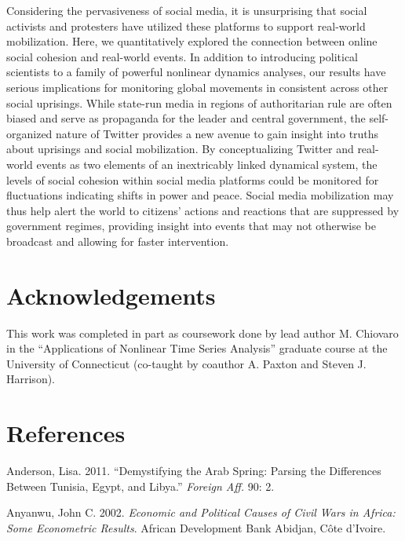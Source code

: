 \documentclass[
  english,
  man]{apa6}
\begin{document}
Considering the pervasiveness of social media, it is unsurprising that social
activists and protesters have utilized these platforms to support real-world
mobilization. Here, we quantitatively explored the connection between online
social cohesion and real-world events. In addition to introducing political
scientists to a family of powerful nonlinear dynamics analyses, our results have
serious implications for monitoring global movements in consistent across other
social uprisings. While state-run media in regions of authoritarian rule are
often biased and serve as propaganda for the leader and central government, the
self-organized nature of Twitter provides a new avenue to gain insight into
truths about uprisings and social mobilization. By conceptualizing Twitter and
real-world events as two elements of an inextricably linked dynamical system,
the levels of social cohesion within social media platforms could be monitored
for fluctuations indicating shifts in power and peace. Social media mobilization
may thus help alert the world to citizens' actions and reactions that are
suppressed by government regimes, providing insight into events that may not
otherwise be broadcast and allowing for faster intervention.

\hypertarget{acknowledgements}{%
\section{Acknowledgements}\label{acknowledgements}}

This work was completed in part as coursework done by lead author M. Chiovaro in
the \enquote{Applications of Nonlinear Time Series Analysis} graduate course at the
University of Connecticut (co-taught by coauthor A. Paxton and Steven J.
Harrison).

\newpage

\hypertarget{references}{%
\section{References}\label{references}}

\begingroup
\setlength{\parindent}{-0.5in}
\setlength{\leftskip}{0.5in}

\hypertarget{refs}{}
\leavevmode\hypertarget{ref-anderson2011demystifying}{}%
Anderson, Lisa. 2011. ``Demystifying the Arab Spring: Parsing the Differences Between Tunisia, Egypt, and Libya.'' \emph{Foreign Aff.} 90: 2.

\leavevmode\hypertarget{ref-anyanwu2002economic}{}%
Anyanwu, John C. 2002. \emph{Economic and Political Causes of Civil Wars in Africa: Some Econometric Results}. African Development Bank Abidjan, Côte d'Ivoire.
\end{document}
